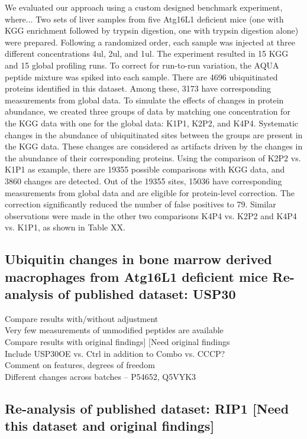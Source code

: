\documentclass[mcp]{article}
\numberwithin{figure}{section} %
\numberwithin{table}{section}
\begin{document}
We evaluated our approach using a custom designed benchmark experiment, where...
Two sets of liver samples from five Atg16L1 deficient mice (one with KGG enrichment followed by trypsin digestion, one with trypsin digestion alone) were prepared. Following a randomized order, each sample was injected at three different concentrations 4ul, 2ul, and 1ul. The experiment resulted in 15 KGG and 15 global profiling runs. To correct for run-to-run variation, the AQUA peptide mixture was spiked into each sample. There are 4696 ubiquitinated proteins identified in this dataset. Among these, 3173 have corresponding measurements from global data.
To simulate the effects of changes in protein abundance, we created three groups of data by matching one concentration for the KGG data with one for the global data: K1P1, K2P2, and K4P4. Systematic changes in the abundance of ubiquitinated sites between the groups are present in the KGG data. These changes are considered as artifacts driven by the changes in the abundance of their corresponding proteins. Using the comparison of K2P2 vs. K1P1 as example, there are 19355 possible comparisons with KGG data, and 3860 changes are detected. Out of the 19355 sites, 15036 have corresponding measurements from global data and are eligible for protein-level correction. The correction significantly reduced the number of false positives to 79. Similar observations were made in the other two comparisons K4P4 vs. K2P2 and K4P4 vs. K1P1, as shown in Table XX.  

\subsection*{Ubiquitin changes in bone marrow derived macrophages from Atg16L1 deficient mice Re-analysis of published dataset: USP30}

Compare results with/without adjustment\\
Very few measurements of unmodified peptides are available\\
Compare results with original findings] [Need original findings\\
Include USP30OE vs. Ctrl in addition to Combo vs. CCCP?\\
Comment on features, degrees of freedom\\
Different changes across batches – P54652, Q5VYK3


\subsection*{Re-analysis of published dataset: RIP1 [Need this dataset and original findings]}
\end{document}
